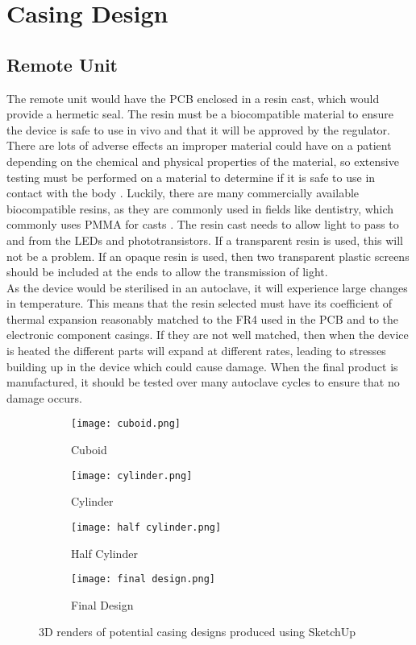 \section{Casing Design}

\subsection{Remote Unit}
The remote unit would have the PCB enclosed in a resin cast, which would provide a hermetic seal. The resin must be a biocompatible material to ensure the device is safe to use in vivo and that it will be approved by the regulator. There are lots of adverse effects an improper material could have on a patient depending on the chemical and physical properties of the material, so extensive testing must be performed on a material to determine if it is safe to use in contact with the body \cite{biocompatible_tests}. Luckily, there are many commercially available biocompatible resins, as they are commonly used in fields like dentistry, which commonly uses PMMA for casts \cite{biocompatible_resin}. The resin cast needs to allow light to pass to and from the LEDs and phototransistors. If a transparent resin is used, this will not be a problem. If an opaque resin is used, then two transparent plastic screens should be included at the ends to allow the transmission of light.\\

As the device would be sterilised in an autoclave, it will experience large changes in temperature. This means that the resin selected must have its coefficient of thermal expansion reasonably matched to the FR4 used in the PCB and to the electronic component casings. If they are not well matched, then when the device is heated the different parts will expand at different rates, leading to stresses building up in the device which could cause damage. When the final product is manufactured, it should be tested over many autoclave cycles to ensure that no damage occurs.\\

\begin{figure}[htbp]
	\centering
	\begin{subfigure}[b]{0.4\linewidth}
		\texttt{[image: cuboid.png]}
		\caption{Cuboid}
		\label{fig: cuboid}
	\end{subfigure}
	\begin{subfigure}[b]{0.4\linewidth}
		\texttt{[image: cylinder.png]}
		\caption{Cylinder}
		\label{fig: cylinder}
	\end{subfigure}
	\begin{subfigure}[b]{0.4\linewidth}
		\texttt{[image: half cylinder.png]}
		\caption{Half Cylinder}
		\label{fig: half cylinder}
	\end{subfigure}
	\begin{subfigure}[b]{0.4\linewidth}
		\texttt{[image: final design.png]}
		\caption{Final Design}
		\label{fig: final design}
	\end{subfigure}
	\caption{3D renders of potential casing designs produced using SketchUp \cite{sketchup}}
	\label{fig: casings}
\end{figure}

